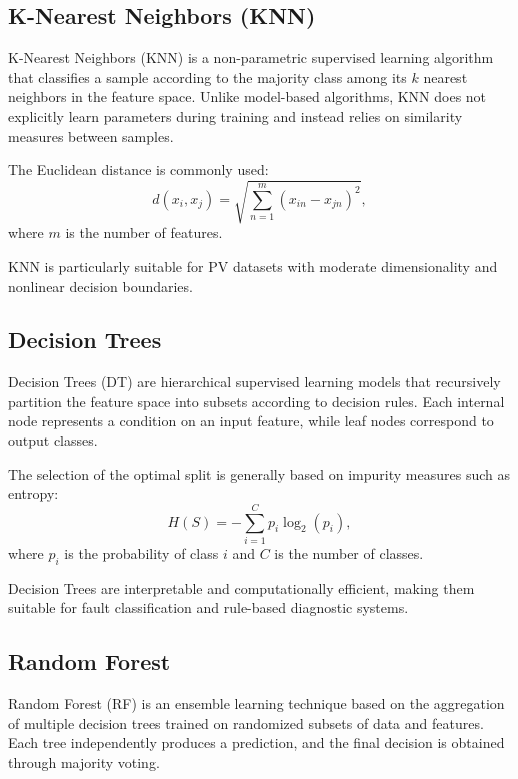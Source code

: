 \subsection{K-Nearest Neighbors (KNN)}

K-Nearest Neighbors (KNN) is a non-parametric supervised learning algorithm that classifies a sample according to the majority class among its $k$ nearest neighbors in the feature space. Unlike model-based algorithms, KNN does not explicitly learn parameters during training and instead relies on similarity measures between samples.

The Euclidean distance is commonly used:
\begin{equation}
d(x_i,x_j)=\sqrt{\sum_{n=1}^{m}(x_{in}-x_{jn})^2},
\end{equation}
where $m$ is the number of features.

KNN is particularly suitable for PV datasets with moderate dimensionality and nonlinear decision boundaries.

\subsection{Decision Trees}

Decision Trees (DT) are hierarchical supervised learning models that recursively partition the feature space into subsets according to decision rules. Each internal node represents a condition on an input feature, while leaf nodes correspond to output classes.

The selection of the optimal split is generally based on impurity measures such as entropy:
\begin{equation}
H(S)=-\sum_{i=1}^{C}p_i\log_2(p_i),
\end{equation}
where $p_i$ is the probability of class $i$ and $C$ is the number of classes.

Decision Trees are interpretable and computationally efficient, making them suitable for fault classification and rule-based diagnostic systems.

\subsection{Random Forest}

Random Forest (RF) is an ensemble learning technique based on the aggregation of multiple decision trees trained on randomized subsets of data and features. Each tree independently produces a prediction, and the final decision is obtained through majority voting.

